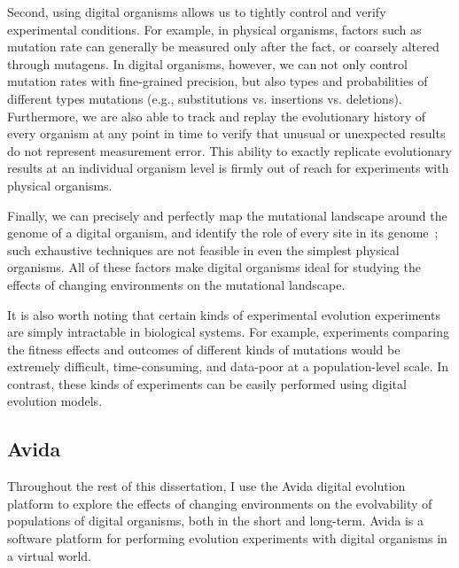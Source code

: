 \documentclass[PhD]{msu-thesis}
\begin{document}
Second, using digital organisms allows us to tightly control and verify experimental conditions. For example, in physical organisms, factors such as mutation rate can generally be measured only after the fact, or coarsely altered through mutagens. In digital organisms, however, we can not only control mutation rates with fine-grained precision, but also types and probabilities of different types mutations (e.g., substitutions vs. insertions vs. deletions). Furthermore, we are also able to track and replay the evolutionary history of every organism at any point in time to verify that unusual or unexpected results do not represent measurement error. This ability to exactly replicate evolutionary results at an individual organism level is firmly out of reach for experiments with physical organisms.

Finally, we can precisely and perfectly map the mutational landscape around the genome of a digital organism, and identify the role of every site in its genome~\cite{ofria_evolution_2002}; such exhaustive techniques are not feasible in even the simplest physical organisms. All of these factors make digital organisms ideal for studying the effects of changing environments on the mutational landscape.

It is also worth noting that certain kinds of experimental evolution experiments are simply intractable in biological systems. For example, experiments comparing the fitness effects and outcomes of different kinds of mutations would be extremely difficult, time-consuming, and data-poor at a population-level scale. In contrast, these kinds of experiments can be easily performed using digital evolution models.

\subsection{Avida}

Throughout the rest of this dissertation, I use the Avida digital evolution platform to explore the effects of changing environments on the evolvability of populations of digital organisms, both in the short and long-term.  %
Avida is a software platform for performing evolution experiments with digital organisms in a virtual world.
\end{document}
